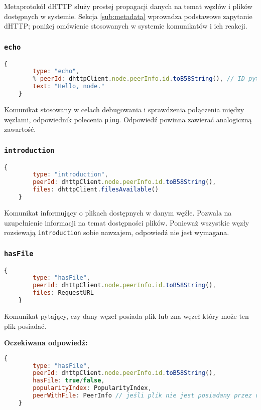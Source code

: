 Metaprotokół dHTTP służy prostej propagacji danych na temat węzłów i plików dostępnych w systemie. Sekcja \ref{sub:metadata} wprowadza podstawowe zapytanie dHTTP; poniżej omówienie stosowanych w systemie komunikatów i ich reakcji.

% 

\subsubsection{\texttt{echo}}
\begin{lstlisting}[language=javascript]
    {
        type: "echo",
        % peerId: dhttpClient.node.peerInfo.id.toB58String(), // ID pytającego
        text: "Hello, node."
    }
\end{lstlisting}

Komunikat stosowany w celach debugowania i sprawdzenia połączenia między węzłami, odpowiednik polecenia \texttt{ping}. Odpowiedź powinna zawierać analogiczną zawartość.

% 

\subsubsection{\texttt{introduction}}
\begin{lstlisting}[language=javascript]
    {
        type: "introduction",
        peerId: dhttpClient.node.peerInfo.id.toB58String(),
        files: dhttpClient.filesAvailable()
    }
\end{lstlisting}

Komunikat informujący o plikach dostępnych w danym węźle. Pozwala na uzupełnienie informacji na temat dostępności plików. Ponieważ wszystkie węzły rozsiewają \texttt{introduction} sobie nawzajem, odpowiedź nie jest wymagana.

% 

\subsubsection{\texttt{hasFile}}
\begin{lstlisting}[language=javascript]
    {
        type: "hasFile",
        peerId: dhttpClient.node.peerInfo.id.toB58String(),
        files: RequestURL
    }
\end{lstlisting}

Komunikat pytający, czy dany węzeł posiada plik lub zna węzeł który może ten plik posiadać.

\pagebreak
\textbf{Oczekiwana odpowiedź:}
\begin{lstlisting}[language=javascript]
    {
        type: "hasFile",
        peerId: dhttpClient.node.peerInfo.id.toB58String(),
        hasFile: true/false,
        popularityIndex: PopularityIndex,
        peerWithFile: PeerInfo // jeśli plik nie jest posiadany przez dany węzeł, ale wie on o potencjalnym posiadaczu
    }
\end{lstlisting}

